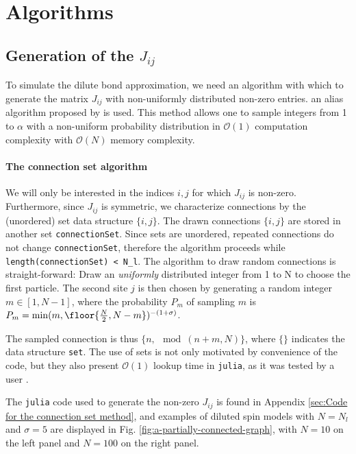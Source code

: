 \section{Algorithms}

\subsection{Generation of the $J_{ij}$}

To simulate the dilute bond approximation, we need an algorithm with which to generate the matrix $J_{ij}$ with non-uniformly distributed non-zero entries.
an alias algorithm proposed by \cite{Walker1974} is used. This method allows one to sample integers from 1 to $\alpha$ with a non-uniform probability distribution in $\mathcal{O}(1)$ computation complexity with $\mathcal{O}(N)$ memory complexity. 

\paragraph{The connection set algorithm}%
\label{sub:The connection set algorithm}

We will only be interested in the indices $i, j$ for which  $J_{ij}$ is non-zero. Furthermore, since $J_{ij}$ is symmetric, we characterize connections by the (unordered) set data structure $\{i, j\}$.
The drawn connections $\{ i, j \} $ are stored in another set \texttt{connectionSet}. Since sets are unordered, repeated connections do not change \texttt{connectionSet}, therefore the algorithm proceeds while \texttt{length(connectionSet) < N\_l}. The algorithm to draw random connections is straight-forward: Draw an \textit{uniformly} distributed integer from 1 to N to choose the first particle. The second site $j$ is then chosen by generating a random integer $m \in [1, N-1]$, where the probability $P_m$ of sampling $m$ is  $P_m = \min(m, \floor{\frac{N}{2}, N - m})^{-(1+\sigma)}$. 

The sampled connection is thus $\{n, \mod(n+m, N)\}$, where $\{\}$ indicates the data structure \texttt{set}. 
The use of sets is not only motivated by convenience of the code, but they also present $\mathcal{O}(1)$ lookup time in \texttt{julia}, as it was tested by a user \cite{setTime}.

The \texttt{julia} code used to generate the non-zero $J_{ij}$ is found in Appendix \ref{sec:Code for the connection set method}, and examples of diluted spin models with $N=N_l$ and $\sigma = 5$ are displayed in Fig. \ref{fig:a-partially-connected-graph}, with $N=10$ on the left panel and $N=100$ on the right panel.


